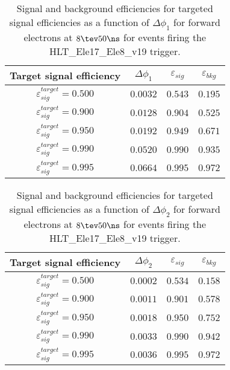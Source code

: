 \clearpage

\begin{table}[!bht]
  \begin{center}
    \begin{tabular}{cccc}
      \hline
      Target signal efficiency & $\Delta\phi_1$ & $\varepsilon_{sig}$ & $\varepsilon_{bkg}$ \\ 
      \hline
      $\varepsilon_{sig}^{target} = 0.500$ & $  0.0032$ & $0.543$ & $0.195$ \\
      $\varepsilon_{sig}^{target} = 0.900$ & $  0.0128$ & $0.904$ & $0.525$ \\
      $\varepsilon_{sig}^{target} = 0.950$ & $  0.0192$ & $0.949$ & $0.671$ \\
      $\varepsilon_{sig}^{target} = 0.990$ & $  0.0520$ & $0.990$ & $0.935$ \\
      $\varepsilon_{sig}^{target} = 0.995$ & $  0.0664$ & $0.995$ & $0.972$ \\
      \hline
    \end{tabular}
    \caption{Signal and background efficiencies for targeted signal efficiencies as a function of $\Delta\phi_1$ for forward electrons at $8\tev 50\ns$ for events firing the HLT\_Ele17\_Ele8\_v19 trigger.}
    \label{tab:eff_rej_phi1_beam_8_50_trigger_17_8_F}
  \end{center}
\end{table}

\clearpage

\begin{table}[!bht]
  \begin{center}
    \begin{tabular}{cccc}
      \hline
      Target signal efficiency & $\Delta\phi_2$ & $\varepsilon_{sig}$ & $\varepsilon_{bkg}$ \\ 
      \hline
      $\varepsilon_{sig}^{target} = 0.500$ & $  0.0002$ & $0.534$ & $0.158$ \\
      $\varepsilon_{sig}^{target} = 0.900$ & $  0.0011$ & $0.901$ & $0.578$ \\
      $\varepsilon_{sig}^{target} = 0.950$ & $  0.0018$ & $0.950$ & $0.752$ \\
      $\varepsilon_{sig}^{target} = 0.990$ & $  0.0033$ & $0.990$ & $0.942$ \\
      $\varepsilon_{sig}^{target} = 0.995$ & $  0.0036$ & $0.995$ & $0.972$ \\
      \hline
    \end{tabular}
    \caption{Signal and background efficiencies for targeted signal efficiencies as a function of $\Delta\phi_2$ for forward electrons at $8\tev 50\ns$ for events firing the HLT\_Ele17\_Ele8\_v19 trigger.}
    \label{tab:eff_rej_phi2_beam_8_50_trigger_17_8_F}
  \end{center}
\end{table}

